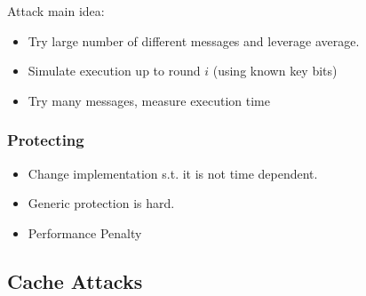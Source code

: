 Attack main idea:
\begin{itemize}
  \item Try large number of different messages and leverage average.
  \item Simulate execution up to round $i$ (using known key bits)
  \item Try many messages, measure execution time
\end{itemize}

\subsubsection{Protecting}
\begin{itemize}
  \item Change implementation s.t. it is not time dependent.
  \item Generic protection is hard.
  \item Performance Penalty
\end{itemize}

\subsection{Cache Attacks}


